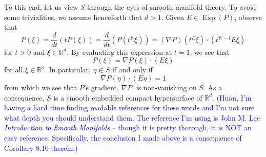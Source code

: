 \documentclass[11pt]{article}
\theoremstyle{theorem}
\newcommand\Exp{\operatorname{Exp}}
\begin{document}
To this end, let us view $S$ through the eyes of smooth manifold theory. To avoid some trivialities, we assume henceforth that $d>1$. Given $E\in\Exp(P)$, observe that
\begin{equation*}
P(\xi)=\frac{d}{dt}\left(tP(\xi)\right)=\frac{d}{dt}(P(t^E\xi))=\left(\nabla P\right)(t^E\xi)\cdot \left(t^{E-I}E\xi\right)
\end{equation*}
for $t>0$ and $\xi\in\mathbb{R}^d$. By evaluating this expression at $t=1$, we see that
\begin{equation*}
P(\xi)=\nabla P(\xi)\cdot(E\xi)
\end{equation*}
for all $\xi\in\mathbb{R}^d$. In particular, $\eta\in S$ if and only if  
\begin{equation*}
\nabla P(\eta)\cdot (E\eta)=1
\end{equation*}
from which we see that $P$'s gradient, $\nabla P$, is non-vanishing on $S$. As a consequence, $S$ is a smooth embedded compact hypersurface of $\mathbb{R}^d$. (\textcolor{blue}{Huan, I'm having a hard time finding readable references for these words and I'm not sure what depth you should understand them. The reference I'm using is John M. Lee \textit{Introduction to Smooth Manifolds} -- though it is pretty thorough, it is NOT an easy reference. Specifically, the conclusion I made above is a consequence of Corollary 8.10 therein.)} 
\end{document}
